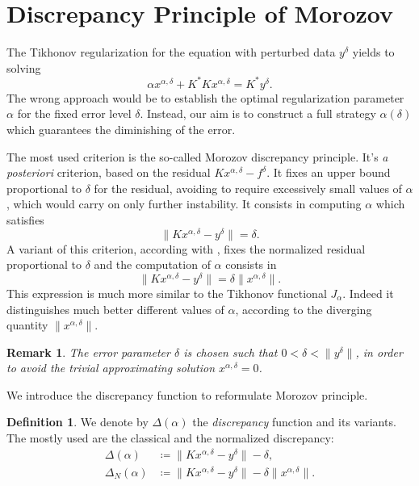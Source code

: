 \documentclass[10pt, a4paper, twoside, openright]{book}
\theoremstyle{definition}
\newtheorem{definition}[subsection]{Definition}
\theoremstyle{plain}
\theoremstyle{plain}
\theoremstyle{plain}
\theoremstyle{plain}
\newtheorem{remark}[subsection]{Remark}
\theoremstyle{plain}
\theoremstyle{plain}
\theoremstyle{plain}
\theoremstyle{plain}
\begin{document}
\section{Discrepancy Principle of Morozov}
The Tikhonov regularization for the equation with perturbed data $y^\delta$ yields to solving
\begin{equation}
\label{eq:tikh-equation-2}
 \alpha x^{\alpha, \delta} + K^*Kx^{\alpha, \delta} = K^*y^\delta.
\end{equation}
The wrong approach would be to establish the optimal regularization parameter $\alpha$ for the fixed error level $\delta$. 
Instead, our aim is to construct a full strategy $\alpha(\delta)$ which guarantees the diminishing 
of the error. 
\par
The most used criterion is the so-called Morozov discrepancy principle. 
It's \emph{a posteriori} criterion, based on the residual $Kx^{\alpha,\delta} - f^\delta$. 
It fixes an upper bound proportional to $\delta$ for the residual, avoiding to require excessively small values 
of $\alpha$, which would carry on only further instability. 
It consists in computing $\alpha$ which satisfies
\begin{equation}
\label{eq:discrepancy-zero}
 \|Kx^{\alpha, \delta} - y ^\delta \|= \delta.
\end{equation}
A variant of this criterion, according with \cite{kirsch:shape-1998}, fixes the normalized residual proportional to $\delta$ and the computation of $\alpha$ consists in
\begin{equation}
\label{eq:discrepancy-relative-zero}
 \|Kx^{\alpha, \delta} - y ^\delta \|= \delta\|x^{\alpha,\delta}\|.
\end{equation}
This expression is much more similar to the Tikhonov functional $J_\alpha$.
Indeed it distinguishes much better different values of $\alpha$, according to the diverging quantity $\|x^{\alpha,\delta}\|$.
\begin{remark}
 The error parameter $\delta$ is chosen such that $0<\delta<\|y^\delta\|$, in order to avoid the trivial approximating solution $x^{\alpha,\delta}= 0$.
\end{remark}
We introduce the discrepancy function to reformulate Morozov principle.
\begin{definition}
 We denote by $\Delta(\alpha)$ the \emph{discrepancy} function and its variants. The mostly used 
 are the classical and the normalized discrepancy:
 \begin{align}
  \Delta(\alpha)&\coloneqq\|Kx^{\alpha,\delta} - y^\delta\| - \delta, \label{eq:def-disc}\\
  \Delta_N(\alpha)&\coloneqq\|Kx^{\alpha,\delta} - y^\delta\| - \delta\|x^{\alpha,\delta}\|.\label{eq:def-disc-N}
 \end{align}
\end{definition}
\end{document}
